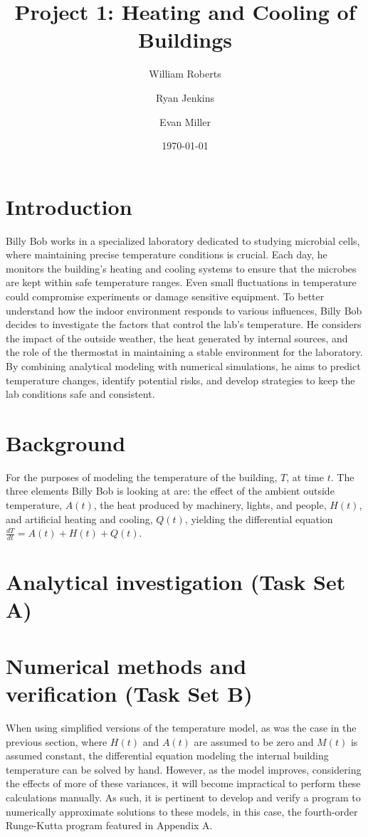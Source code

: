 \documentclass[12pt]{article}
\title{Project 1: Heating and Cooling of Buildings}
\author{William Roberts \and Ryan Jenkins \and Evan Miller}
\date{\today}
\begin{document}
\maketitle

\tableofcontents
\clearpage

\section{Introduction}
Billy Bob works in a specialized laboratory dedicated to studying microbial cells, where maintaining precise temperature conditions is crucial. Each day, he monitors the building’s heating and cooling systems to ensure that the microbes are kept within safe temperature ranges. Even small fluctuations in temperature could compromise experiments or damage sensitive equipment. To better understand how the indoor environment responds to various influences, Billy Bob decides to investigate the factors that control the lab's temperature. He considers the impact of the outside weather, the heat generated by internal sources, and the role of the thermostat in maintaining a stable environment for the laboratory. By combining analytical modeling with numerical simulations, he aims to predict temperature changes, identify potential risks, and develop strategies to keep the lab conditions safe and consistent.

\section{Background}
For the purposes of modeling the temperature of the building, $T$, at time $t$. The three elements Billy Bob is looking at are: the effect of the ambient outside temperature, $A(t)$, the heat produced by machinery, lights, and people, $H(t)$, and artificial heating and cooling, $Q(t)$, yielding the differential equation $ \frac{dT}{dt} = A(t) + H(t) + Q(t)$.

\section{Analytical investigation (Task Set A)}

\section{Numerical methods and verification (Task Set B)}

When using simplified versions of the temperature model, as was the case in the previous section, where $H(t)$ and $A(t)$ are assumed to be zero and $M(t)$ is assumed constant, the differential equation modeling the internal building temperature can be solved by hand. However, as the model improves, considering the effects of more of these variances, it will become impractical to perform these calculations manually. As such, it is pertinent to develop and verify a program to numerically approximate solutions to these models, in this case, the fourth-order Runge-Kutta program featured in Appendix A.
\end{document}
